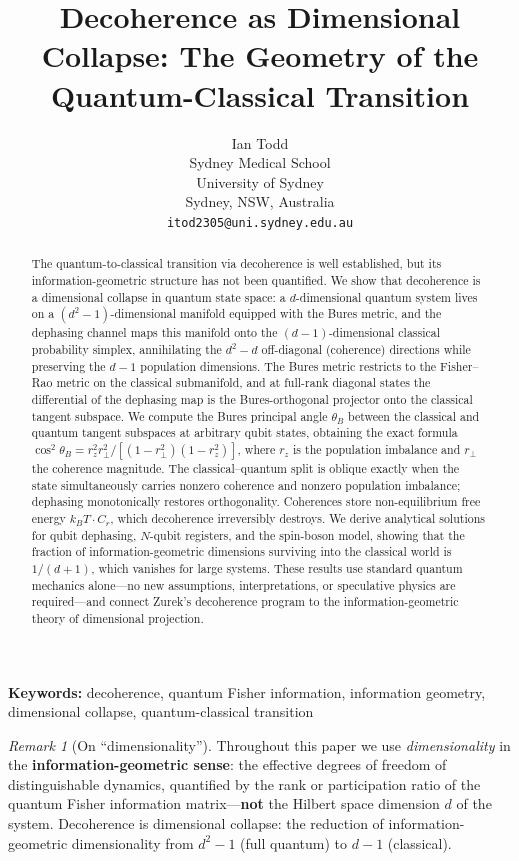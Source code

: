 \documentclass[12pt,a4paper]{article}
\title{Decoherence as Dimensional Collapse: The Geometry of the Quantum-Classical Transition}
\author{Ian Todd\\
Sydney Medical School\\
University of Sydney\\
Sydney, NSW, Australia\\
\texttt{itod2305@uni.sydney.edu.au}}
\date{}
\theoremstyle{definition}
\theoremstyle{remark}
\newtheorem{remark}[theorem]{Remark}
\begin{document}
\maketitle

\begin{abstract}
The quantum-to-classical transition via decoherence is well established, but its information-geometric structure has not been quantified. We show that decoherence is a dimensional collapse in quantum state space: a $d$-dimensional quantum system lives on a $(d^2-1)$-dimensional manifold equipped with the Bures metric, and the dephasing channel maps this manifold onto the $(d-1)$-dimensional classical probability simplex, annihilating the $d^2-d$ off-diagonal (coherence) directions while preserving the $d-1$ population dimensions. The Bures metric restricts to the Fisher--Rao metric on the classical submanifold, and at full-rank diagonal states the differential of the dephasing map is the Bures-orthogonal projector onto the classical tangent subspace. We compute the Bures principal angle $\theta_B$ between the classical and quantum tangent subspaces at arbitrary qubit states, obtaining the exact formula $\cos^2\theta_B = r_z^2 r_\perp^2/[(1-r_\perp^2)(1-r_z^2)]$, where $r_z$ is the population imbalance and $r_\perp$ the coherence magnitude. The classical--quantum split is oblique exactly when the state simultaneously carries nonzero coherence and nonzero population imbalance; dephasing monotonically restores orthogonality. Coherences store non-equilibrium free energy $k_BT \cdot C_r$, which decoherence irreversibly destroys. We derive analytical solutions for qubit dephasing, $N$-qubit registers, and the spin-boson model, showing that the fraction of information-geometric dimensions surviving into the classical world is $1/(d+1)$, which vanishes for large systems. These results use standard quantum mechanics alone---no new assumptions, interpretations, or speculative physics are required---and connect Zurek's decoherence program to the information-geometric theory of dimensional projection.
\end{abstract}

\noindent\textbf{Keywords:} decoherence, quantum Fisher information, information geometry, dimensional collapse, quantum-classical transition

\begin{remark}[On ``dimensionality'']
\label{rem:dimensionality}
Throughout this paper we use \emph{dimensionality} in the \textbf{information-geometric sense}: the effective degrees of freedom of distinguishable dynamics, quantified by the rank or participation ratio of the quantum Fisher information matrix---\textbf{not} the Hilbert space dimension $d$ of the system. Decoherence is dimensional collapse: the reduction of information-geometric dimensionality from $d^2 - 1$ (full quantum) to $d - 1$ (classical).
\end{remark}
\end{document}
